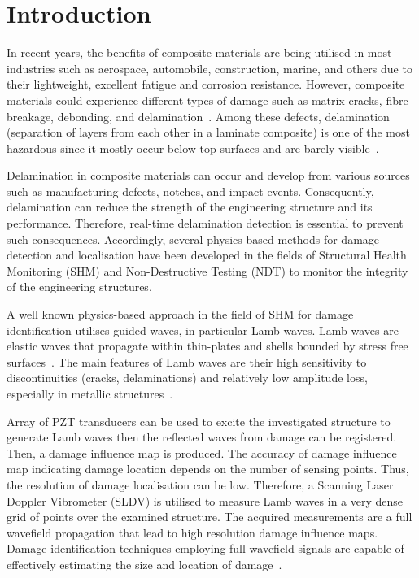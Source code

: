 \section{Introduction}
In recent years, the benefits of composite materials are being utilised in most industries such as aerospace, automobile, construction, marine, and others due to their lightweight, excellent fatigue and corrosion resistance.
However, composite materials could experience different types of damage such as matrix cracks, fibre breakage, debonding, and delamination~\cite{ip2004delamination, smith2009composite}. 
Among these defects, delamination (separation of layers from each other in a laminate composite) is one of the most hazardous since it mostly occur below top surfaces and are barely visible~\cite{Cai2012}.

Delamination in composite materials can occur and develop from various sources such as  manufacturing defects, notches, and impact events.
Consequently, delamination can reduce the strength of the engineering structure and its performance. 
Therefore, real-time delamination detection is essential to prevent such consequences.  
Accordingly, several physics-based methods for damage detection and localisation have been developed in the fields of Structural Health Monitoring (SHM) and Non-Destructive Testing (NDT) to monitor the integrity of the engineering structures.

A well known physics-based approach in the field of SHM for damage identification utilises guided waves, in particular Lamb waves.
Lamb waves are elastic waves that propagate within thin-plates and shells bounded by stress free surfaces~\cite{mitra2016guided}.
The main features of Lamb waves are their high sensitivity to discontinuities (cracks, delaminations) and relatively low amplitude loss, especially in metallic structures~\cite{Keulen2014}.

Array of PZT transducers can be used to excite the investigated structure to generate Lamb waves then the reflected waves from damage can be registered. 
Then, a damage influence map is produced.
The accuracy of damage influence map indicating damage location depends on the number of sensing points. 
Thus, the resolution of damage localisation can be low.
Therefore, a Scanning Laser Doppler Vibrometer (SLDV) is utilised to measure Lamb waves in a very dense grid of points over the examined structure.
The acquired measurements are a full wavefield propagation that lead to high resolution damage influence maps.
Damage identification techniques employing full wavefield signals are capable of effectively estimating the size and location of damage~\cite{Girolamo2018a, kudela2018impact}. 

